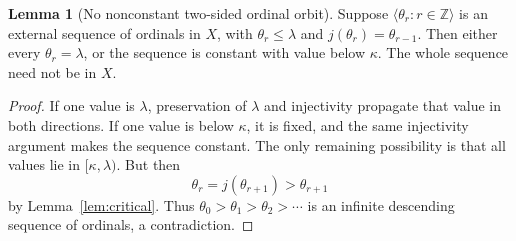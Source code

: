 \documentclass[11pt,letterpaper]{article}
\theoremstyle{definition}
\newtheorem{lemma}[definition]{Lemma}
\numberwithin{equation}{section}
\newcommand{\ZZ}{\mathbb Z}
\begin{document}
\begin{lemma}[No nonconstant two-sided ordinal orbit]\label{lem:two-sided}
Suppose $\langle\theta_r:r\in\ZZ\rangle$ is an external sequence of ordinals in $X$, with $\theta_r\le\lambda$ and $j(\theta_r)=\theta_{r-1}$. Then either every $\theta_r=\lambda$, or the sequence is constant with value below $\kappa$. The whole sequence need not be in $X$.
\end{lemma}
\begin{proof}
If one value is $\lambda$, preservation of $\lambda$ and injectivity propagate that value in both directions. If one value is below $\kappa$, it is fixed, and the same injectivity argument makes the sequence constant. The only remaining possibility is that all values lie in $[\kappa,\lambda)$. But then
\[
\theta_r=j(\theta_{r+1})>\theta_{r+1}
\]
by Lemma~\ref{lem:critical}. Thus $\theta_0>\theta_1>\theta_2>\cdots$ is an infinite descending sequence of ordinals, a contradiction.
\end{proof}
\end{document}
